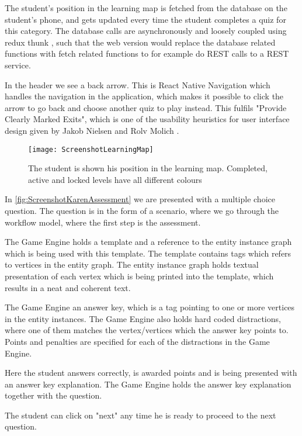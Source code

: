 The student's position in the learning map is fetched from the database on the student's phone, and gets updated every time the student completes a quiz for this category. The database calls are asynchronously and loosely coupled using redux thunk \parencite{ReduxJS-thunk}, such that the web version would replace the database related functions with fetch related functions to for example do REST calls to a REST service. 

In the header we see a back arrow. This is React Native Navigation \parencite{Wix} which handles the navigation in the application, which makes it possible to click the arrow to go back and choose another quiz to play instead. This fulfils "Provide Clearly Marked Exits", which is one of the usability heuristics for user interface design given by Jakob Nielsen and Rolv Molich \parencite{Molich1990}.

\begin{figure}[h!]
	\texttt{[image: ScreenshotLearningMap]}
	\caption {The student is shown his position in the learning map. Completed, active and locked levels have all different colours}
	\label{fig:ScreenshotLearningMap}
\end{figure}

In \ref{fig:ScreenshotKarenAssessment} we are presented with a multiple choice question. The question is in the form of a scenario, where we go through the workflow model, where the first step is the assessment.  

The Game Engine holds a template and a reference to the entity instance graph which is being used with this template. The template contains tags which refers to vertices in the entity graph. The entity instance graph holds textual presentation of each vertex which is being printed into the template, which results in a neat and coherent text. 

The Game Engine an answer key, which is a tag pointing to one or more vertices in the entity instances. The Game Engine also holds hard coded distractions, where one of them matches the vertex/vertices which the answer key points to. Points and penalties are specified for each of the distractions in the Game Engine.

Here the student answers correctly, is awarded points and is being presented with an answer key explanation. The Game Engine holds the answer key explanation together with the question. 

The student can click on "next" any time he is ready to proceed to the next question.

